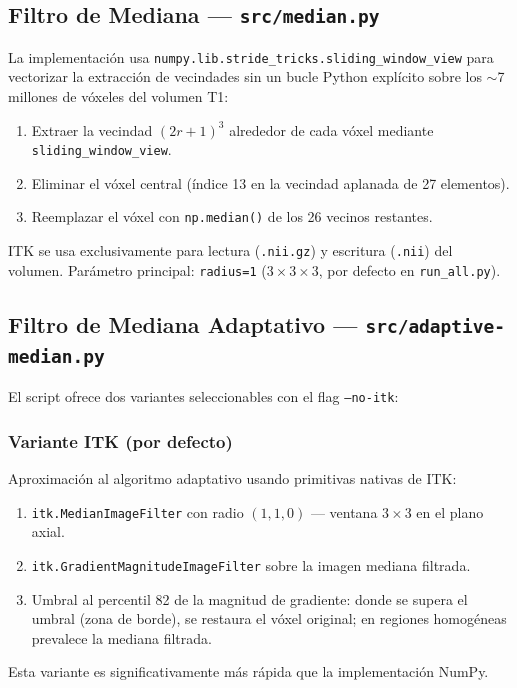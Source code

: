 \documentclass[12pt, a4paper]{article}
\begin{document}
\subsection{Filtro de Mediana — \texttt{src/median.py}}

La implementación usa \texttt{numpy.lib.stride\_tricks.sliding\_window\_view} para
vectorizar la extracción de vecindades sin un bucle Python explícito sobre los $\sim$7
millones de vóxeles del volumen T1:

\begin{enumerate}
  \item Extraer la vecindad $(2r+1)^3$ alrededor de cada vóxel mediante \texttt{sliding\_window\_view}.
  \item Eliminar el vóxel central (índice 13 en la vecindad aplanada de 27 elementos).
  \item Reemplazar el vóxel con \texttt{np.median()} de los 26 vecinos restantes.
\end{enumerate}

ITK se usa exclusivamente para lectura (\texttt{.nii.gz}) y escritura (\texttt{.nii}) del
volumen. Parámetro principal: \texttt{radius=1} ($3\times3\times3$, por defecto en
\texttt{run\_all.py}).

\subsection{Filtro de Mediana Adaptativo — \texttt{src/adaptive-median.py}}

El script ofrece dos variantes seleccionables con el flag \texttt{--no-itk}:

\subsubsection{Variante ITK (por defecto)}

Aproximación al algoritmo adaptativo usando primitivas nativas de ITK:
\begin{enumerate}
  \item \texttt{itk.MedianImageFilter} con radio $(1,1,0)$ — ventana $3\times3$ en el
    plano axial.
  \item \texttt{itk.GradientMagnitudeImageFilter} sobre la imagen mediana filtrada.
  \item Umbral al percentil 82 de la magnitud de gradiente: donde se supera el umbral
    (zona de borde), se restaura el vóxel original; en regiones homogéneas prevalece la
    mediana filtrada.
\end{enumerate}
Esta variante es significativamente más rápida que la implementación NumPy.
\end{document}
